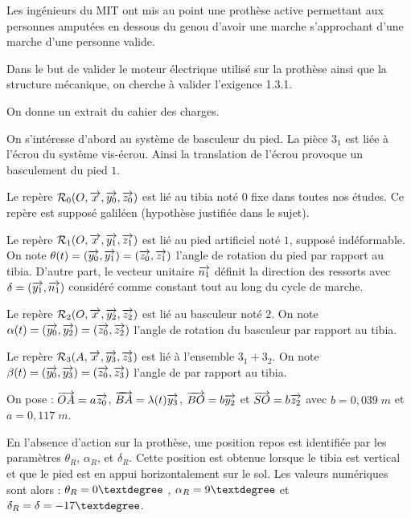 \documentclass[10pt,fleqn]{article} %
\begin{document}

\vspace{10cm}
\pagestyle{fancy}
\thispagestyle{plain}


\def\columnseprulecolor{\color{ocre}}
\setlength{\columnseprule}{0.4pt} 
\begin{multicols}{2}

\ifprof
\else

Les ingénieurs du MIT ont mis au point une prothèse active permettant aux personnes amputées en dessous du genou d'avoir une marche s'approchant d'une marche d'une personne valide. 
\begin{obj} 
Dans le but de valider le moteur électrique utilisé sur la prothèse ainsi que la structure mécanique, on cherche à valider l'exigence 1.3.1.
\end{obj}

 On donne un extrait du cahier des charges.
 





On s'intéresse d'abord au système de basculeur du pied. La pièce $3_1$ est liée à l'écrou du système vis-écrou. Ainsi la translation de l'écrou provoque un basculement du pied $1$. 

Le repère $\mathcal{R}_{0} (O, \overrightarrow{x_{}},\overrightarrow{y_{0}} ,\overrightarrow{z_{0}})$ est lié au tibia noté $0$ fixe dans toutes nos études. Ce repère est supposé galiléen (hypothèse justifiée dans le sujet).

Le repère $\mathcal{R}_{1} (O, \overrightarrow{x_{}},\overrightarrow{y_{1}} ,\overrightarrow{z_{1}} )$ est lié au pied artificiel noté $1$, supposé indéformable. On note $\theta (t)=(\overrightarrow{y_{0}} ,\overrightarrow{y_{1}})=(\overrightarrow{z_{0}},\overrightarrow{z_{1}})$ l'angle de rotation du pied par rapport au tibia. D'autre part, le vecteur unitaire $\overrightarrow{n_1}$ définit la direction des ressorts avec $\delta=(\overrightarrow{y_{1}} ,\overrightarrow{n_1})$ considéré comme constant tout au long
du cycle de marche.

Le repère $\mathcal{R}_{2} (O, \overrightarrow{x_{}} ,\overrightarrow{y_{2}} ,\overrightarrow{z_{2}} )$ est lié au basculeur noté $2$. On note $\alpha(t) =(\overrightarrow{y_{0}} ,\overrightarrow{y_{2}})=(\overrightarrow{z_{0}} ,\overrightarrow{z_{2}})$ l'angle de rotation du basculeur par rapport au tibia.

Le repère $\mathcal{R}_{3} ( A, \overrightarrow{x_{}},\overrightarrow{y_{3}} ,\overrightarrow{z_{3}})$ est lié à l'ensemble $3_1+3_2$. On note $\beta(t )=(\overrightarrow{y_{0}} ,\overrightarrow{y_{3}})=(\overrightarrow{z_{0}} ,\overrightarrow{z_{3}})$ l'angle de par rapport au tibia.

On pose : $\overrightarrow{OA}=a\overrightarrow{z_0}$, $\overrightarrow{BA}=\lambda(t)\overrightarrow{y_{3}}$, $\overrightarrow{BO}=b\overrightarrow{y_{2}}$ et 
$\overrightarrow{SO}=b\overrightarrow{z_{2}}$ avec $b=0,039 \; m$ et $a=0,117\;m$.

En l'absence d'action sur la prothèse, une position repos est identifiée par les paramètres $\theta_R$, $\alpha_R$, et $\delta_R$. Cette position est obtenue lorsque le tibia est vertical et que le pied est en appui horizontalement
sur le sol. Les valeurs numériques sont alors : $\theta_R=0\textdegree$ , $\alpha_R=9\textdegree$ et $\delta_R=\delta=-17\textdegree$.



\end{multicols}
\end{document}
